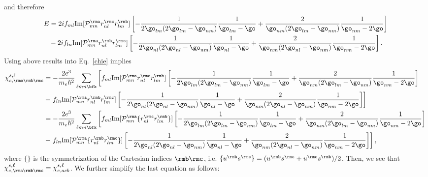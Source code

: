and therefore
\begin{align}\label{pfen}  
E&=  
2if_{ml}\mathrm{Im}[{\cal P}^{\rma}_{mn}r^{\rmc}_{nl}r^{\rmb}_{lm}] 
\left[
-\frac{1}{2\go_{lm}(2\go_{lm}-\go_{nm})}\frac{1}{\go_{lm}-\go}
+\frac{2}{\go_{nm}(2\go_{lm}-\go_{nm})}\frac{1}{\go_{nm}-2\go}
\right]
\nonumber\\
&- 
2if_{ln}\mathrm{Im}[{\cal P}^{\rma}_{mn}r^{\rmb}_{nl}r^{\rmc}_{lm}]
\left[
-\frac{1}{2\go_{nl}(2\go_{nl}-\go_{nm})}\frac{1}{\go_{nl}-\go}
+\frac{2}{\go_{nm}(2\go_{nl}-\go_{nm})}\frac{1}{\go_{nm}-2\go}
\right]
.
\end{align}  
Using above results into Eq.~\eqref{chie} implies
\begin{align}\label{pfen3} 
\chi_{e,\rma\rmb\rmc}^{s,\ell}
&= 
-\frac{2e^3}{m_e\hbar^2} 
\sum_{\ell m n\bfk}
\left[ 
f_{ml}\mathrm{Im}[{\cal P}^{\rma}_{mn}r^{\rmc}_{nl}r^{\rmb}_{lm}] 
\left[
-\frac{1}{2\go_{lm}(2\go_{lm}-\go_{nm})}\frac{1}{\go_{lm}-\go}
+\frac{2}{\go_{nm}(2\go_{lm}-\go_{nm})}\frac{1}{\go_{nm}-2\go}
\right]
\right.
\nonumber\\
&-
\left. 
f_{ln}\mathrm{Im}[{\cal P}^{\rma}_{mn}r^{\rmb}_{nl}r^{\rmc}_{lm}]
\left[
-\frac{1}{2\go_{nl}(2\go_{nl}-\go_{nm})}\frac{1}{\go_{nl}-\go}
+\frac{2}{\go_{nm}(2\go_{nl}-\go_{nm})}\frac{1}{\go_{nm}-2\go}
\right]
\right]
\nonumber\\
&= 
-\frac{2e^3}{m_e\hbar^2} 
\sum_{\ell m n\bfk}
\left[ 
f_{ml}\mathrm{Im}[{\cal P}^{\rma}_{mn}\{r^{\rmc}_{nl}r^{\rmb}_{lm}\}] 
\left[
-\frac{1}{2\go_{lm}(2\go_{lm}-\go_{nm})}\frac{1}{\go_{lm}-\go}
+\frac{2}{\go_{nm}(2\go_{lm}-\go_{nm})}\frac{1}{\go_{nm}-2\go}
\right]
\right.
\nonumber\\
&-
\left. 
f_{ln}\mathrm{Im}[{\cal P}^{\rma}_{mn}\{r^{\rmb}_{nl}r^{\rmc}_{lm}\}]
\left[
-\frac{1}{2\go_{nl}(2\go_{nl}-\go_{nm})}\frac{1}{\go_{nl}-\go}
+\frac{2}{\go_{nm}(2\go_{nl}-\go_{nm})}\frac{1}{\go_{nm}-2\go}
\right]
\right]
,
\end{align}  
where $\{\}$ is the symmetrization of the Cartesian indices $\rmb\rmc$, i.e. 
$\{u^{\rmb}s^{\rmc}\}=(u^{\rmb}s^{\rmc}+u^{\rmc}s^{\rmb})/2$. 
Then, we see that
$\chi_{e,\rma\rmb\rmc}^{s,\ell}=\chi_{e,acb}^{s,\ell}$. We further simplify 
the last equation as follows:
